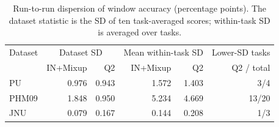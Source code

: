 \begin{table}[pos=htbp]
\centering\small
\caption{Run-to-run dispersion of window accuracy (percentage points). The dataset statistic is the SD of ten task-averaged scores; within-task SD is averaged over tasks.}
\label{tab:stability}
\begin{tabular}{lrrrrr}
\toprule
Dataset & \multicolumn{2}{c}{Dataset SD} & \multicolumn{2}{c}{Mean within-task SD} & Lower-SD tasks\\
 & IN+Mixup & Q2 & IN+Mixup & Q2 & Q2 / total\\
\midrule
PU & 0.976 & 0.943 & 1.572 & 1.403 & 3/4\\
PHM09 & 1.848 & 0.950 & 5.234 & 4.669 & 13/20\\
JNU & 0.079 & 0.167 & 0.144 & 0.208 & 1/3\\
\bottomrule
\end{tabular}
\end{table}
